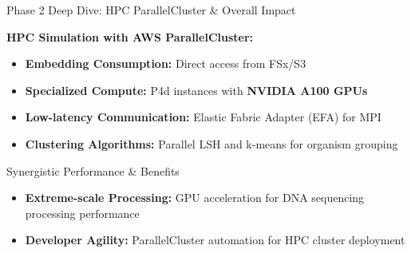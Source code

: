 \documentclass[aspectratio=169]{beamer}
\begin{document}
\begin{frame}{Phase 2 Deep Dive: HPC ParallelCluster \& Overall Impact}

            \textbf{HPC Simulation with AWS ParallelCluster:}
            \begin{itemize}
                \item \textbf{Embedding Consumption:} Direct access from FSx/S3
                \item \textbf{Specialized Compute:} P4d instances with \textcolor{awsorange}{\textbf{NVIDIA A100 GPUs}}
                \item \textbf{Low-latency Communication:} Elastic Fabric Adapter (EFA) for MPI
                \item \textbf{Clustering Algorithms:} Parallel LSH and k-means for organism grouping
            \end{itemize}

    
    \vspace{0.3cm}
    \begin{block}{Synergistic Performance \& Benefits}
        \begin{itemize}
            
            \item \textbf{Extreme-scale Processing:} GPU acceleration for DNA sequencing processing performance
            \item \textbf{Developer Agility:} ParallelCluster automation for HPC cluster deployment
        \end{itemize}
    \end{block}
\end{frame}
\end{document}
